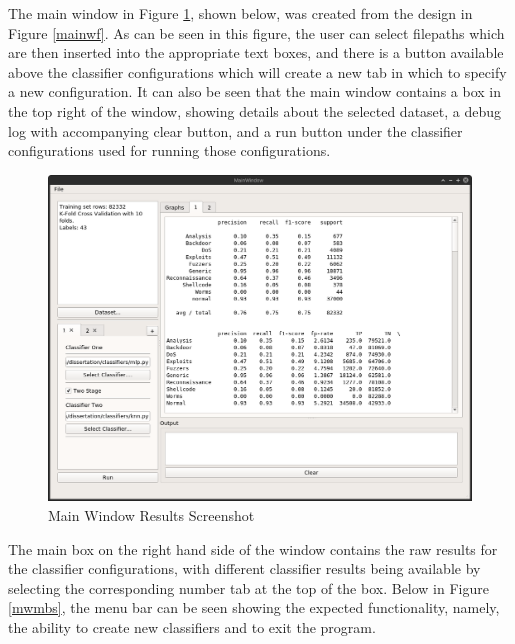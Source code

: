 \documentclass[12pt,a4paper]{article}
\begin{document}
The main window in Figure \ref{mwrs}, shown below, was created from the design in Figure \ref{mainwf}. As can be seen in this figure, the user can select filepaths which are then inserted into the appropriate text boxes, and there is a button available above the classifier configurations which will create a new tab in which to specify a new configuration. It can also be seen that the main window contains a box in the top right of the window, showing details about the selected dataset, a debug log with accompanying clear button, and a run button under the classifier configurations used for running those configurations.
\begin{figure}[H]
	\centering
	\includegraphics[width=1.0\textwidth]{figures/mainwindowresultscreenshot}
	\caption{Main Window Results Screenshot}
	\label{mwrs}
\end{figure}
The main box on the right hand side of the window contains the raw results for the classifier configurations, with different classifier results being available by selecting the corresponding number tab at the top of the box.
Below in Figure \ref{mwmbs}, the menu bar can be seen showing the expected functionality, namely, the ability to create new classifiers and to exit the program.
\end{document}

